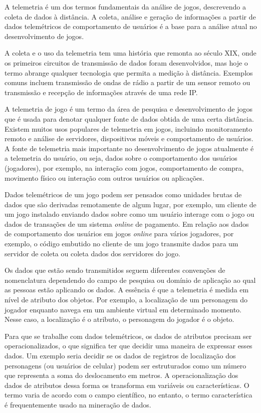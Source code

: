 A telemetria é um dos termos fundamentais da análise de jogos, descrevendo a coleta de dados à distância. A coleta, análise e geração de informações a partir de dados telemétricos de comportamento de usuários é a base para a análise atual no desenvolvimento de jogos.

A coleta e o uso da telemetria tem uma história que remonta ao século XIX, onde os primeiros circuitos de transmissão de dados foram desenvolvidos, mas hoje o termo abrange qualquer tecnologia que permita a medição à distância. Exemplos comuns incluem transmissão de ondas de rádio a partir de um sensor remoto ou transmissão e recepção de informações através de uma rede IP.

A telemetria de jogo é um termo da área de pesquisa e desenvolvimento de jogos que é usada para denotar qualquer fonte de dados obtida de uma certa distância. Existem muitos usos populares de telemetria em jogos, incluindo monitoramento remoto e análise de servidores, dispositivos móveis e comportamento de usuários. A fonte de telemetria mais importante no desenvolvimento de jogos atualmente é a telemetria do usuário, ou seja, dados sobre o comportamento dos usuários (jogadores), por exemplo, na interação com jogos, comportamento de compra, movimento físico ou interação com outros usuários ou aplicações.

Dados telemétricos de um jogo podem ser pensados como unidades brutas de dados que são derivadas remotamente de algum lugar, por exemplo, um cliente de um jogo instalado enviando dados sobre como um usuário interage com o jogo ou dados de transações de um sistema \textit{online} de pagamento. Em relação aos dados de comportamento dos usuários em jogos \textit{online} para vários jogadores, por exemplo, o código embutido no cliente de um jogo transmite dados para um servidor de coleta ou coleta dados dos servidores do jogo.

Os dados que estão sendo transmitidos seguem diferentes convenções de nomenclatura dependendo do campo de pesquisa ou domínio de aplicação ao qual as pessoas estão aplicando os dados. A essência é que a telemetria é medida em nível de atributo dos objetos. Por exemplo, a localização de um personagem do jogador enquanto navega em um ambiente virtual em determinado momento. Nesse caso, a localização é o atributo, o personagem do jogador é o objeto.

Para que se trabalhe com dados telemétricos, os dados de atributos precisam ser operacionalizados, o que significa ter que decidir uma maneira de expressar esses dados. Um exemplo seria decidir se os dados de registros de localização dos personagens (ou usuários de celular) podem ser estruturados como um número que representa a soma do deslocamento em metros. A operacionalização dos dados de atributos dessa forma os transforma em variáveis ou características. O termo varia de acordo com o campo científico, no entanto, o termo característica é frequentemente usado na mineração de dados.

